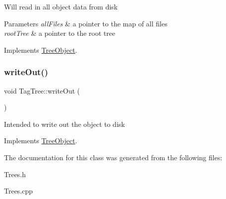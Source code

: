 Will read in all object data from disk 
\begin{DoxyParams}{Parameters}
{\em all\+Files} & a pointer to the map of all files \\
\hline
{\em root\+Tree} & a pointer to the root tree \\
\hline
\end{DoxyParams}


Implements \mbox{\hyperlink{classTreeObject_a8247e79f2b4c1760649ac6f1af1c583f}{Tree\+Object}}.

\mbox{\label{classTagTree_ae316c2517c607547f02ce43b63a6316d}} 
\subsubsection{\texorpdfstring{write\+Out()}{writeOut()}}
{\footnotesize\ttfamily void Tag\+Tree\+::write\+Out (\begin{DoxyParamCaption}{ }\end{DoxyParamCaption})\hspace{0.3cm}{\ttfamily [virtual]}}

Intended to write out the object to disk 

Implements \mbox{\hyperlink{classTreeObject_abf2bf88337bec961784b5dfeb9b795ed}{Tree\+Object}}.



The documentation for this class was generated from the following files\+:\begin{DoxyCompactItemize}
\item 
Trees.\+h\item 
Trees.\+cpp\end{DoxyCompactItemize}

